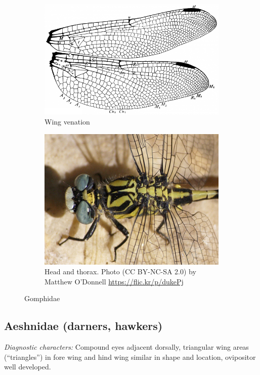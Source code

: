 \documentclass[letterpaper, 11pt]{article}
\begin{document}
\begin{figure}[ht!]
    \centering
    \begin{subfigure}[ht!]{0.5\textwidth}
        \includegraphics[width=\textwidth]{GomphidaeWing}
        \caption{Wing venation \citep[][Fig. 229]{comstock1918wings}}
        \label{fig:gomphid1}
    \end{subfigure}
    \hfill
    \begin{subfigure}[ht!]{0.4\textwidth}
        \includegraphics[width=\textwidth]{GomphidHead}
        \caption{Head and thorax. Photo (CC BY-NC-SA 2.0) by Matthew O’Donnell \url{https://flic.kr/p/dukePj}}
        \label{fig:gomphid2}
    \end{subfigure}
    \caption{Gomphidae}\label{fig:gomphids}
\end{figure}

\subsection{Aeshnidae (darners, hawkers)}
\noindent{}\textit{Diagnostic characters:} Compound eyes adjacent dorsally, triangular wing areas (``triangles'') in fore wing and hind wing similar in shape and location, ovipositor well developed.\\
\end{document}
